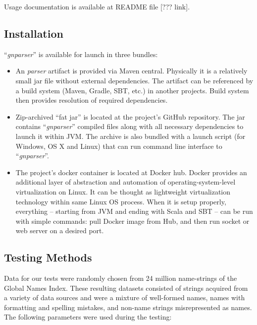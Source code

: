 \documentclass{bmcart}
\begin{document}
Usage documentation is available at README file [??? link].

\subsection*{Installation}

``\textit{gnparser}'' is available for launch in three bundles:

\begin{itemize}
  \item An \textit{parser} artifact is provided via Maven central. Physically
    it is a relatively small jar file without external dependencies. The
    artifact can be referenced by a build system (Maven, Gradle, SBT, etc.) in
    another projects. Build system then provides resolution of required
    dependencies.

  \item Zip-archived ``fat jar'' is located at the project's GitHub repository.
    The jar contains ``\textit{gnparser}'' compiled files along with all
    necessary dependencies to launch it within JVM. The archive is also bundled
    with a launch script (for Windows, OS X and Linux) that can run command
    line interface to ``\textit{gnparser}''.

  \item The project's docker container is located at Docker hub. Docker
    provides an additional layer of abstraction and automation of
    operating-system-level virtualization on Linux. It can be thought as
    lightweight virtualization technology within same Linux OS process. When it
    is setup properly, everything -- starting from JVM and ending with Scala
    and SBT -- can be run with simple commands: pull Docker image from Hub, and
    then run socket or web server on a desired port.

\end{itemize}

\subsection*{Testing Methods}

Data for our tests were randomly chosen from 24 million name-strings of the
Global Names Index. These resulting datasets consisted of strings acquired
from a variety of data sources and were a mixture of well-formed names, names
with formatting and spelling mistakes, and non-name strings misrepresented as
names. The following parameters were used during the testing:
\end{document}
